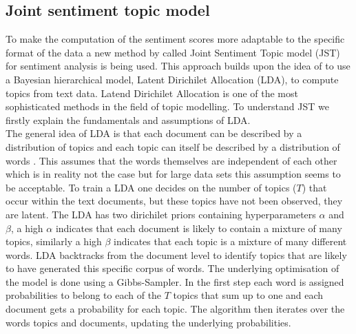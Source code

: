 \subsection{Joint sentiment topic model}\label{JST}
To make the computation of the sentiment scores more adaptable to the specific format of the data a new method by \citet{lin2009joint} called Joint Sentiment Topic model (JST) for sentiment analysis is being used. This approach builds upon the idea of \citet{blei2003latent} to use a Bayesian hierarchical model, Latent Dirichilet Allocation (LDA), to compute topics from text data. Latend Dirichilet Allocation is one of the most sophisticated methods in the field of topic modelling. To understand JST we firstly explain the fundamentals and assumptions of LDA. \\ 

The general idea of LDA is that each document can be described by a distribution of topics and each topic can itself be described by a distribution of words \citep{blei2003latent}. This assumes that the words themselves are independent of each other which is in reality not the case but for large data sets this assumption seems to be acceptable. To train a LDA one decides on the number of topics ($T$) that occur within the text documents, but these topics have not been observed, they are latent. The LDA has two dirichilet priors containing hyperparameters $\alpha$ and $\beta$, a high $\alpha$ indicates that each document is likely to contain a mixture of many topics, similarly a high $\beta$ indicates that each topic is a mixture of many different words. LDA backtracks from the document level to identify topics that are likely to have generated this specific corpus of words. The underlying optimisation of the model is done using a Gibbs-Sampler. In the first step each word is assigned probabilities to belong to each of the $T$ topics that sum up to one and each document gets a probability for each topic. The algorithm then iterates over the words topics and documents, updating the underlying probabilities. 

